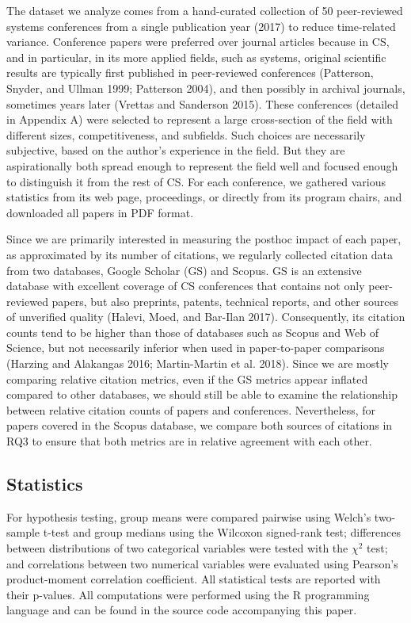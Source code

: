 \documentclass{article}
\begin{document}
The dataset we analyze comes from a hand-curated collection of 50 peer-reviewed systems conferences from a single publication year (2017) to reduce time-related variance.
Conference papers were preferred over journal articles because in CS, and in particular, in its more applied fields, such as systems, original scientific results are typically first published in peer-reviewed conferences (Patterson, Snyder, and Ullman 1999; Patterson 2004), and then possibly in archival journals, sometimes years later (Vrettas and Sanderson 2015).
These conferences (detailed in Appendix A) were selected to represent a large cross-section of the field with different sizes, competitiveness, and subfields.
Such choices are necessarily subjective, based on the author's experience in the field.
But they are aspirationally both spread enough to represent the field well and focused enough to distinguish it from the rest of CS.
For each conference, we gathered various statistics from its web page, proceedings, or directly from its program chairs, and downloaded all papers in PDF format.

Since we are primarily interested in measuring the posthoc impact of each paper, as approximated by its number of citations, we regularly collected citation data from two databases, Google Scholar (GS) and Scopus.
GS is an extensive database with excellent coverage of CS conferences that contains not only peer-reviewed papers, but also preprints, patents, technical reports, and other sources of unverified quality (Halevi, Moed, and Bar-Ilan 2017).
Consequently, its citation counts tend to be higher than those of databases such as Scopus and Web of Science, but not necessarily inferior when used in paper-to-paper comparisons (Harzing and Alakangas 2016; Martin-Martin et al. 2018).
Since we are mostly comparing relative citation metrics, even if the GS metrics appear inflated compared to other databases, we should still be able to examine the relationship between relative citation counts of papers and conferences.
Nevertheless, for papers covered in the Scopus database, we compare both sources of citations in RQ3 to ensure that both metrics are in relative agreement with each other.

\hypertarget{statistics}{%
\subsection*{Statistics}\label{statistics}}

For hypothesis testing, group means were compared pairwise using Welch's two-sample t-test and group medians using the Wilcoxon signed-rank test; differences between distributions of two categorical variables were tested with the \(\chi^{2}\) test; and correlations between two numerical variables were evaluated using Pearson's product-moment correlation coefficient.
All statistical tests are reported with their p-values.
All computations were performed using the R programming language and can be found in the source code accompanying this paper.
\end{document}
